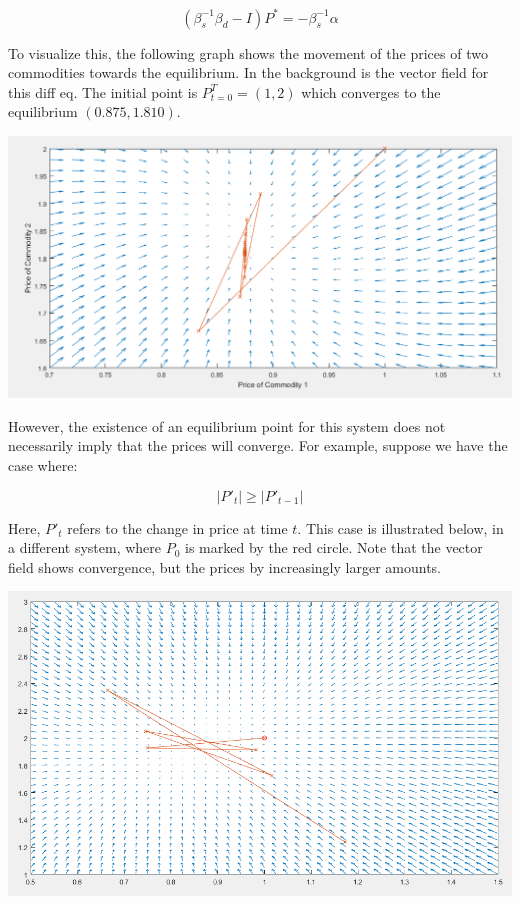 \documentclass[12pt]{article}
\begin{document}
$$(\beta_s^{-1} \beta_d - I) P^* = -\beta_s^{-1} \alpha$$

To visualize this, the following graph shows the movement of the prices of two commodities towards the equilibrium. In the background is the vector field for this diff eq. The initial point is $P_{t=0}^T = (1,2)$ which converges to the equilibrium $(0.875,1.810)$.

\begin{center}
	\includegraphics[scale = 0.5]{figures/vector_field}
\end{center}

However, the existence of an equilibrium point for this system does not necessarily imply that the prices will converge. For example, suppose we have the case where:

$$| P'_t | \geq | P'_{t-1} | $$

Here, $P'_t$ refers to the change in price at time $t$. This case is illustrated below, in a different system, where $P_0$ is marked by the red circle. Note that the vector field shows convergence, but the prices by increasingly larger amounts. 

\begin{center}
	\includegraphics[scale = 0.5]{figures/vector_field2}
\end{center}
\end{document}
